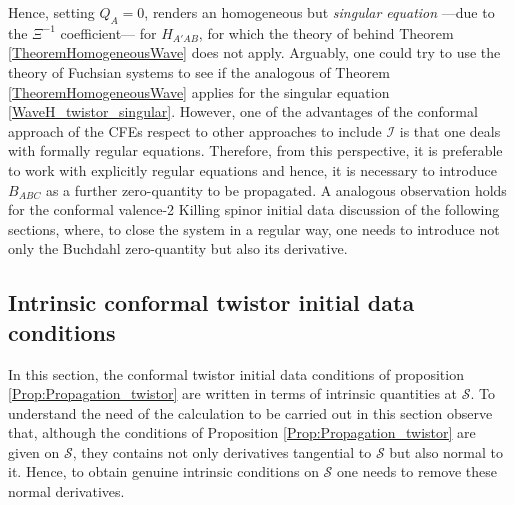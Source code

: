 \documentclass[10pt,a4paper]{article}
\theoremstyle{plain}
\begin{document}
Hence, setting $Q_{A}=0$, renders an homogeneous but
\emph{singular equation} ---due to the $\Xi^{-1}$ coefficient---
for $H_{A'AB}$, for which the theory of behind Theorem
\ref{TheoremHomogeneousWave} does not apply. Arguably, one could try
to use the theory of Fuchsian systems to see if the analogous of
Theorem \ref{TheoremHomogeneousWave} applies for the singular equation
\eqref{WaveH_twistor_singular}.  However, one of the advantages of the
conformal approach of the CFEs respect to other approaches to include
$\mathscr{I}$ is that one deals with formally regular equations.
Therefore, from this perspective,
it is preferable to work with explicitly regular equations and hence,
it is necessary to introduce $B_{ABC}$ as a further zero-quantity to
be propagated.  A analogous observation holds for the conformal valence-2
Killing spinor initial data discussion of the following sections,
where, to close the system in a regular way, one needs to introduce not
only the Buchdahl zero-quantity but also its derivative.





\subsection{Intrinsic conformal twistor initial data conditions}

In this section, the conformal twistor initial data conditions of
proposition \ref{Prop:Propagation_twistor} are written in terms of
intrinsic quantities at $\mathcal{S}$.  To understand the need of the
calculation to be carried out in this section observe that, although
the conditions of Proposition \ref{Prop:Propagation_twistor} are given
on $\mathcal{S}$, they contains not only derivatives tangential to
$\mathcal{S}$ but also normal to it. Hence, to obtain genuine
intrinsic conditions on $\mathcal{S}$ one needs to remove these normal
derivatives.
\end{document}

